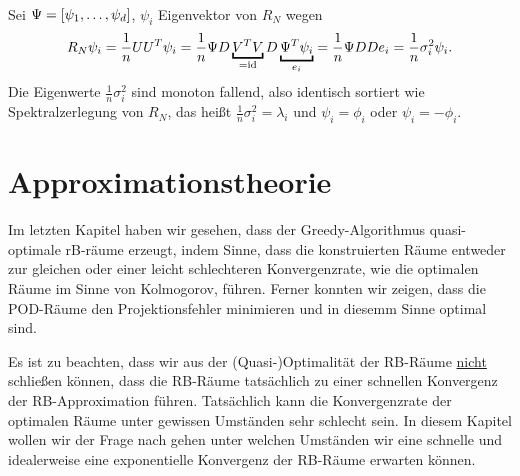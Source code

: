 \\
Sei $\Psi=[\psi_1, \dots ,\psi_d]$, $\psi_i$ Eigenvektor von $R_N$ wegen
\[
R_N\psi_i = \frac{1}{n} UU^T \psi_i = \frac{1}{n} \Psi D \underbracket{V^TV}_{=\id}D \underbracket{\Psi^T\psi_i}_{e_i} = \frac{1}{n} \Psi DD e_i = \frac{1}{n} \sigma_i^2\psi_i.
\]
Die Eigenwerte $\frac{1}{n}\sigma_i^2$ sind monoton fallend, also identisch sortiert wie Spektralzerlegung von $R_N$, das heißt $\frac{1}{n} \sigma_i^2 = \lambda_i$ und $\psi_i=\phi_i$ oder $\psi_i=-\phi_i$.


\section{Approximationstheorie}


Im letzten Kapitel haben wir gesehen, dass der Greedy-Algorithmus quasi-optimale rB-räume erzeugt, indem Sinne, dass die konstruierten Räume entweder zur gleichen oder einer leicht schlechteren Konvergenzrate, wie die optimalen Räume im Sinne von Kolmogorov, führen.
Ferner konnten wir zeigen, dass die POD-Räume den Projektionsfehler minimieren und in diesemm Sinne optimal sind.

Es ist zu beachten, dass wir aus der (Quasi-)Optimalität der RB-Räume \uline{nicht} schließen können, dass die RB-Räume tatsächlich zu einer schnellen Konvergenz der RB-Approximation führen.
Tatsächlich kann die Konvergenzrate der optimalen Räume unter gewissen Umständen sehr schlecht sein.
In diesem Kapitel wollen wir der Frage nach gehen unter welchen Umständen wir eine schnelle und idealerweise eine exponentielle Konvergenz der RB-Räume erwarten können.

